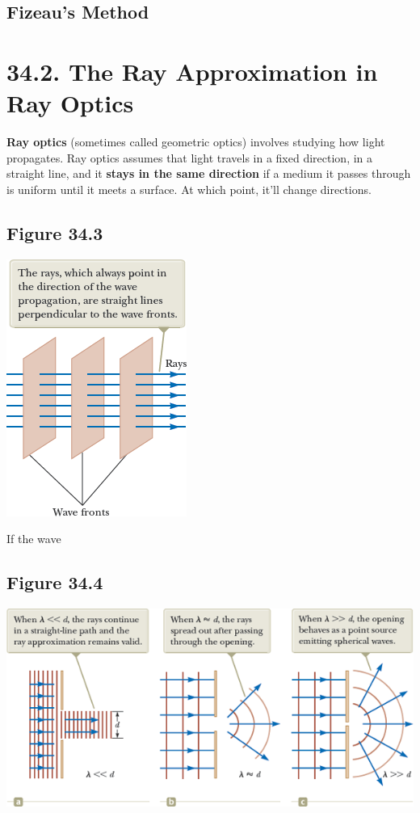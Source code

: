 \documentclass[12pt, letterpaper]{article}
\begin{document}
\subsection*{Fizeau's Method}

\section*{34.2. The Ray Approximation in Ray Optics}
\normalsize\textbf{Ray optics} (sometimes called geometric optics) involves studying how light propagates. Ray optics assumes that light travels in a fixed direction, in a straight line, and it \textbf{stays in the same direction} if a medium it passes through is uniform until it meets a surface. At which point, it'll change directions. 

\subsection*{Figure 34.3}
\begin{center}
    \includegraphics{34.3.png}
\end{center}
If the wave 

\subsection*{Figure 34.4}
\begin{center}
    \includegraphics{34.4.png}
\end{center}
\end{document}
